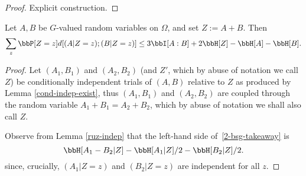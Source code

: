 \begin{proof}\leanok Explicit construction.
\end{proof}


\begin{lemma}\label{lem-bsg}
  \leanok
  Let $A,B$ be $G$-valued random variables on $\Omega$, and set $Z := A+B$.
Then
\begin{equation}\label{2-bsg-takeaway} \sum_{z}  \bbP[Z=z] d[(A | Z = z); (B | Z = z)] \leq 3  \bbI[A:B] + 2 \bbH[Z] - \bbH[A] - \bbH[B]. \end{equation}
\end{lemma}

\begin{proof}
Let $(A_1, B_1)$ and $(A_2, B_2)$ (and $Z'$, which by abuse of notation we call $Z$) be conditionally independent trials of $(A,B)$ relative to $Z$ as produced by Lemma \ref{cond-indep-exist}, thus $(A_1,B_1)$ and $(A_2,B_2)$ are coupled through the random variable $A_1 + B_1 = A_2 + B_2$, which by abuse of notation we shall also call $Z$.

Observe from Lemma \ref{ruz-indep} that the left-hand side of~\eqref{2-bsg-takeaway} is
\begin{equation}\label{lhs-to-bound}
\bbH[A_1 - B_2| Z] - \bbH[A_1 | Z]/2 - \bbH[B_2 | Z]/2.
\end{equation}
since, crucially, $(A_1 | Z=z)$ and $(B_2 | Z=z)$ are independent for all $z$.


\end{proof}
